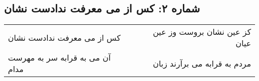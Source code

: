 \begin{center}
\section*{شماره ۲: کس از می معرفت ندادست نشان}
\label{sec:002}
\begin{longtable}{l p{0.5cm} r}
کس از می معرفت ندادست نشان
&&
کز عین نشان بروست وز عین عیان
\\
آن می به قرابه سر به مهرست مدام
&&
مردم به قرابه می برآرند زبان
\\
\end{longtable}
\end{center}
